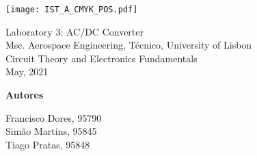 \thispagestyle {empty}

\begin{titlepage}
\texttt{[image: IST\_A\_CMYK\_POS.pdf]}

\begin{center}
%
\vspace{1.0cm}

\vspace{5cm}
{\FontLb Laboratory 3: AC/DC Converter} \\
\vspace{1cm}
{\FontSn Msc. Aerospace Engineering, Técnico, University of Lisbon} \\
\vspace{1cm}
{\FontSn Circuit Theory and Electronics Fundamentals} \\
\vspace{1cm}
{\FontSn May, 2021} \\


\vspace{8cm}


\textbf{{Autores}\\[0.06in]}

Francisco Dores, 95790\\
Simão Martins, 95845\\
Tiago Pratas, 95848\\ 
\vspace{2cm}

\end{center}

\end{titlepage}

